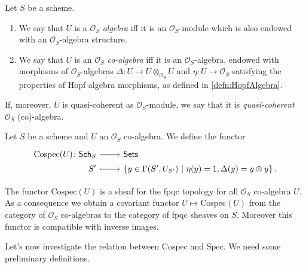 \documentclass[../Main]{subfiles}
\begin{document}
\begin{defn}
	Let $S$ be a scheme.
\begin{enumerate}
\item We say that $U$ is a $\mathcal{O}_{ S }$ {\em algebra}
	iff it is an $\mathcal{O}_{ S }$-module
	which is also endowed with an $\mathcal{O}_{ S }$-algebra structure.
\item We say that $U$ is an $\mathcal{O}_{ S }$ {\em co-algebra}
	iff it is an $\mathcal{O}_{ S }$-algebra, endowed with
	morphisms of $\mathcal{O}_S$-algebras
	$\Delta\colon U \to U \otimes_{\mathcal{O}_{ S }} U$
	and $\eta\colon U \to \mathcal{O}_{ S }$
	satisfying the properties of Hopf algebra morphisms,
	as defined in \cref{defn:HopfAlgebra}.
\end{enumerate}
	If, moreover, $U$ is quasi-coherent as $\mathcal{O}_{ S }$-module,
	we say that it is {\em quasi-coherent} $\mathcal{O}_{ S }$ (co)-algebra.
\end{defn}


\begin{defn}[Cospec]
	Let $S$ be a scheme and $U$ an $\mathcal{O}_{ S }$ co-algebra.
	We define the functor 
	\begin{equation*}
	\begin{tikzcd}[row sep = 0ex
		,/tikz/column 1/.append style={anchor=base east}
		,/tikz/column 2/.append style={anchor=base west}]
		\mathrm{Cospec}(U)\colon 
		\mathsf{Sch}_{ S }\arrow[r, "", rightarrow] &
		\mathsf{Sets} \\
		S' \arrow[r, "", mapsto] & 
		\left\{ y \in \Gamma(S', U_{S'}) \ \middle|\ 
		\eta(y) = 1, \Delta(y) = y \otimes y\right\}
	.\end{tikzcd}
	\end{equation*} 
\end{defn}


\begin{rem}
	The functor $\mathrm{Cospec}(U)$ is a sheaf for the fpqc topology
	for all $\mathcal{O}_{ S }$ co-algebra $U$.
	As a consequence we obtain a covariant functor $U \mapsto \mathrm{Cospec}(U)$
	from the category of $\mathcal{O}_{ S }$ co-algebras to the category
	of fpqc sheaves on $S$.
	Moreover this functor is compatible with inverse images.
\end{rem}


\noindent
Let's now investigate the relation between $\mathrm{Cospec}$ and $\mathrm{Spec}$.
We need some preliminary definitions.
\end{document}
